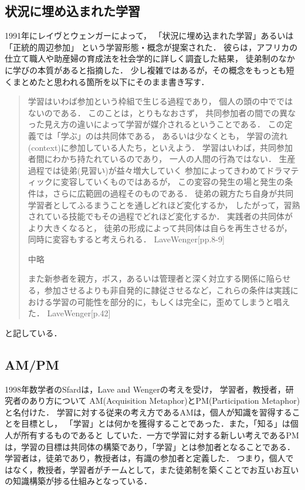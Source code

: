 \documentclass{jsarticle}
\begin{document}
\subsection{状況に埋め込まれた学習}
\label{sec:org89a80b0}
1991年にレイヴとウェンガーによって，
  「状況に埋め込まれた学習」あるいは「正統的周辺参加」
  という学習形態・概念が提案された．
  彼らは，アフリカの仕立て職人や助産婦の育成法を社会学的に詳しく調査した結果，
  徒弟制のなかに学びの本質があると指摘した．
少し複雑ではあるが，その概念をもっとも短くまとめたと思われる箇所を以下にそのまま書き写す．
\begin{quote}
学習はいわば参加という枠組で生じる過程であり，
個人の頭の中でではないのである．
このことは，とりもなおさず，
共同参加者の間での異なった見え方の違いによって学習が媒介されるということである．
この定義では「学ぶ」のは共同体である，
あるいは少なくとも，
学習の流れ(context)に参加している人たち，といえよう．
学習はいわば，共同参加者間にわかち持たれているのであり，
一人の人間の行為ではない．
生産過程では徒弟(見習い)が益々増大していく
参加によってきわめてドラマティックに変容していくものではあるが，
この変容の発生の場と発生の条件は，さらに広範囲の過程そのものである．
徒弟の親方たち自身が共同学習者としてふるまうことを通しどれほど変化するか，
したがって，習熟されている技能でもその過程でどれほど変化するか．
実践者の共同体がより大きくなると，
徒弟の形成によって共同体は自らを再生させるが，
同時に変容もすると考えられる．
LaveWenger[pp.8-9]

中略

また新参者を親方，ボス，あるいは管理者と深く対立する関係に陥らせる，参加させるよりも非自発的に隷従させるなど，これらの条件は実践における学習の可能性を部分的に，もしくは完全に，歪めてしまうと唱えた．
 LaveWenger[p.42]
\end{quote}
と記している．

\subsection{AM/PM}
\label{sec:org3bf5853}
1998年数学者のSfardは，Lave and Wengerの考えを受け，
学習者，教授者，研究者のあり方について
AM(Acquisition Metaphor)とPM(Participation Metaphor)と名付けた．
学習に対する従来の考え方であるAMは，個人が知識を習得することを目標とし，
「学習」とは何かを獲得することであった．また，「知る」は個人が所有するものであると
していた．一方で学習に対する新しい考えであるPMは，学習の目標は共同体の構築であり，「学習」とは参加者となることである．学習者は，徒弟であり，教授者は，有識の参加者と定義した．
つまり，個人ではなく，教授者，学習者がチームとして，また徒弟制を築くことでお互いお互いの知識構築が捗る仕組みとなっている．
\end{document}
